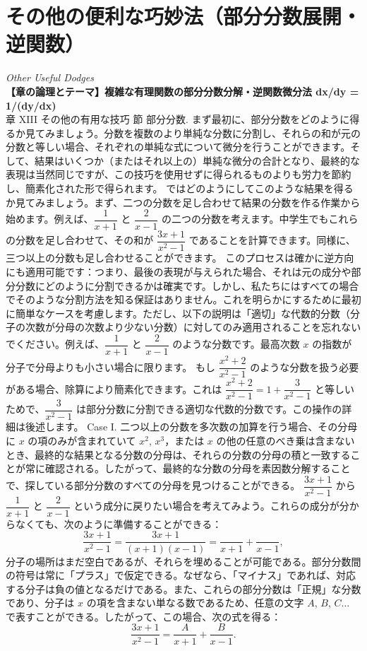 \documentclass[a4paper,11pt,openany]{ltjsbook}
\begin{document}
\chapter{その他の便利な巧妙法（部分分数展開・逆関数）}
\noindent\textit{\large Other Useful Dodges}\\[2mm]
\noindent\textbf{\small 【章の論理とテーマ】複雑な有理関数の部分分数分解・逆関数微分法 dx/dy = 1/(dy/dx)}\\[4mm]
章 XIII その他の有用な技巧
節 部分分数.
まず最初に、部分分数をどのように得るか見てみましょう。分数を複数のより単純な分数に分割し、それらの和が元の分数と等しい場合、それぞれの単純な式について微分を行うことができます。そして、結果はいくつか（またはそれ以上の）単純な微分の合計となり、最終的な表現は当然同じですが、この技巧を使用せずに得られるものよりも労力を節約し、簡素化された形で得られます。
ではどのようにしてこのような結果を得るか見てみましょう。まず、二つの分数を足し合わせて結果の分数を作る作業から始めます。例えば、$\dfrac{1}{x+1}$ と $\dfrac{2}{x-1}$ の二つの分数を考えます。中学生でもこれらの分数を足し合わせて、その和が $\dfrac{3x+1}{x^2-1}$ であることを計算できます。同様に、三つ以上の分数も足し合わせることができます。
このプロセスは確かに逆方向にも適用可能です：つまり、最後の表現が与えられた場合、それは元の成分や部分分数にどのように分割できるかは確実です。しかし、私たちにはすべての場合でそのような分割方法を知る保証はありません。これを明らかにするために最初に簡単なケースを考慮します。ただし、以下の説明は「適切」な代数的分数（分子の次数が分母の次数より少ない分数）に対してのみ適用されることを忘れないでください。例えば、$\dfrac{1}{x+1}$ と $\dfrac{2}{x-1}$ のような分数です。最高次数 $x$ の指数が分子で分母よりも小さい場合に限ります。
もし $\dfrac{x^2+2}{x^2-1}$ のような分数を扱う必要がある場合、除算により簡素化できます。これは $\dfrac{x^2+2}{x^2-1} = 1 + \dfrac{3}{x^2-1}$ と等しいためで、$\dfrac{3}{x^2-1}$ は部分分数に分割できる適切な代数的分数です。この操作の詳細は後述します。
Case I. 二つ以上の分数を多次数の加算を行う場合、その分母に $x$ の項のみが含まれていて $x^2$, $x^3$，または $x$ の他の任意のべき乗は含まないとき、最終的な結果となる分数の分母は、それらの分数の分母の積と一致することが常に確認される。したがって、最終的な分数の分母を素因数分解することで、探している部分分数のすべての分母を見つけることができる。
$\dfrac{3x+1}{x^2-1}$ から $\dfrac{1}{x+1}$ と $\dfrac{2}{x-1}$ という成分に戻りたい場合を考えてみよう。これらの成分が分からなくても、次のように準備することができる：
\[
\dfrac{3x+1}{x^2-1} = \dfrac{3x+1}{(x+1)(x-1)} = \dfrac{}{x+1} + \dfrac{}{x-1},
\]
分子の場所はまだ空白であるが、それらを埋めることが可能である。部分分数間の符号は常に「プラス」で仮定できる。なぜなら、「マイナス」であれば、対応する分子は負の値となるだけである。また、これらの部分分数は「正規」な分数であり、分子は $x$ の項を含まない単なる数であるため、任意の文字 $A$, $B$, $C \dots$ で表すことができる。したがって、この場合、次の式を得る：
\[
\dfrac{3x+1}{x^2-1} = \dfrac{A}{x+1} + \dfrac{B}{x-1}.
\]
\end{document}
